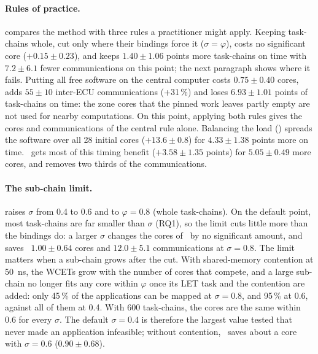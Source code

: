 \paragraph{Rules of practice.}  compares the method
with three rules a practitioner might apply. Keeping task-chains whole,
cut only where their bindings force it ($\sigma=\varphi$), costs no
significant core ($+0.15\pm0.23$), and keeps $1.40\pm1.06$ points more
task-chains on time with $7.2\pm6.1$ fewer communications on this point;
the next paragraph shows where it fails. Putting all free software on the
central computer costs $0.75\pm0.40$ cores, adds $55\pm10$ inter-ECU
communications (+31\,\%) and loses $6.93\pm1.01$ points of task-chains on
time: the zone cores that the pinned work leaves partly empty are not used
for nearby computations. On this point, applying both rules gives the
cores and communications of the central rule alone. Balancing the load (\WFDU) spreads the software
over all 28 initial cores ($+13.6\pm0.8$) for $4.33\pm1.38$ points more on
time. \CADU\ gets most of this timing benefit ($+3.58\pm1.35$ points) for
$5.05\pm0.49$ more cores, and removes two thirds of the communications.



\paragraph{The sub-chain limit.}  raises $\sigma$ from
0.4 to 0.6 and to $\varphi=0.8$ (whole task-chains). On the default point,
most task-chains are far smaller than $\sigma$ (RQ1), so the limit cuts
little more than the bindings do: a larger $\sigma$ changes the cores of
\FFDU\ by no significant amount, and saves \CADU\ $1.00\pm0.64$ cores
and $12.0\pm5.1$ communications at $\sigma=0.8$. The limit matters when a
sub-chain grows after the cut. With shared-memory contention at
\SI{50}{ns}, the WCETs grow with the number of cores that compete, and a
large sub-chain no longer fits any core within $\varphi$ once its LET task
and the contention are added: only 45\,\% of the applications can be
mapped at $\sigma=0.8$, and 95\,\% at 0.6, against all of them at 0.4.
With 600 task-chains, the cores are the same within $0.6$ for every
$\sigma$. The default $\sigma=0.4$ is therefore the largest value tested
that never made an application infeasible; without contention, \CADU\
saves about a core with $\sigma=0.6$ ($0.90\pm0.68$).



